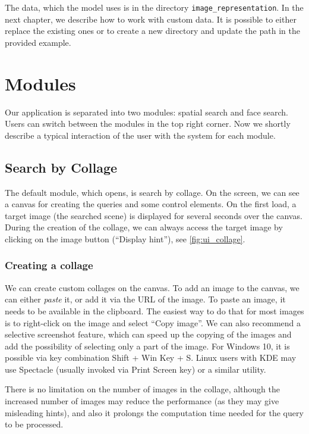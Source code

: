 The data, which the model uses is in the directory \verb+image_representation+. In the next chapter, we describe how to work with custom data. It is possible to either replace the existing ones or to create a new directory and update the path in the provided example.

\section{Modules}

Our application is separated into two modules: spatial search and face search. Users can switch between the modules in the top right corner. Now we shortly describe a typical interaction of the user with the system for each module.

\subsection{Search by Collage}

The default module, which opens, is search by collage. On the screen, we can see a canvas for creating the queries and some control elements. On the first load, a target image (the searched scene) is displayed for several seconds over the canvas. During the creation of the collage, we can always access the target image by clicking on the image button (``Display hint''), see \autoref{fig:ui_collage}.

\subsubsection*{Creating a collage}

We can create custom collages on the canvas. To add an image to the canvas, we can either \emph{paste} it, or add it via the URL of the image. To paste an image, it needs to be available in the clipboard. The easiest way to do that for most images is to right-click on the image and select ``Copy image''. We can also recommend a selective screenshot feature, which can speed up the copying of the images and add the possibility of selecting only a part of the image. For Windows 10, it is possible via key combination Shift + Win Key + S. Linux users with KDE may use Spectacle (usually invoked via Print Screen key) or a similar utility.

There is no limitation on the number of images in the collage, although the increased number of images may reduce the performance (as they may give misleading hints), and also it prolongs the computation time needed for the query to be processed.

